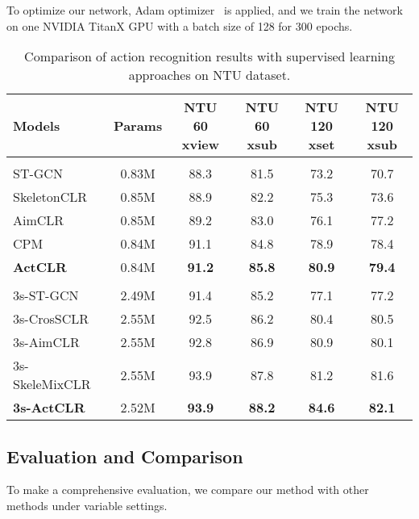 \documentclass[twocolumn]{article}
\begin{document}
To optimize our network, Adam optimizer~\cite{newey1988adaptive} is applied, and we train the network on one NVIDIA TitanX GPU with a batch size of 128 for 300 epochs.

\begin{table*}[tb]
    \small
    \centering
    \caption{Comparison of action recognition results with supervised learning approaches on NTU dataset.}
    \begin{tabular}{l|c|c|c|c|c}
      \toprule
     Models&Params&NTU 60 xview&NTU 60 xsub&NTU 120 xset&NTU 120 xsub\\
      \midrule
      \rowcolor{gray!10} \multicolumn{6}{l}{\textit{Single-stream:}}\\
ST-GCN~\cite{yan2018spatial} & 0.83M & 88.3 & 81.5 & 73.2 & 70.7 \\
      SkeletonCLR~\cite{li20213d} & 0.85M & 88.9 & 82.2 & 75.3 & 73.6\\
      AimCLR~\cite{guo2021contrastive} & 0.85M & 89.2 & 83.0 & 76.1 & 77.2\\
      CPM~\cite{zhang2022contrastive} & 0.84M & 91.1 & 84.8 & 78.9 & 78.4\\
\textbf{ActCLR} & 0.84M & \textbf{91.2} &\textbf{85.8}&\textbf{80.9}& \textbf{79.4}\\
      \midrule
      \rowcolor{gray!10} \multicolumn{6}{l}{\textit{Three-stream:}}\\
      3s-ST-GCN~\cite{yan2018spatial} & 2.49M & 91.4 & 85.2 & 77.1 & 77.2 \\
      3s-CrosSCLR~\cite{li20213d}& 2.55M & 92.5 & 86.2 & 80.4 & 80.5 \\
      3s-AimCLR~\cite{guo2021contrastive}& 2.55M & 92.8 & 86.9 & 80.9 & 80.1\\
      3s-SkeleMixCLR~\cite{chen2022contrastive}& 2.55M & 93.9 & 87.8 & 81.2 & 81.6\\
\textbf{3s-ActCLR} & 2.52M & \textbf{93.9} &\textbf{88.2}&\textbf{84.6}& \textbf{82.1}\\
      \bottomrule
  \end{tabular}
    \label{tab:supervised_ntu}
  \end{table*}

\subsection{Evaluation and Comparison}
To make a comprehensive evaluation, we compare our method with other methods under variable settings.
\vspace{1mm}
\end{document}
